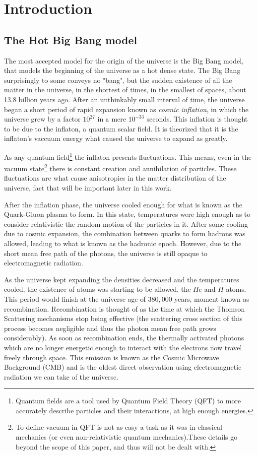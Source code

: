 \chapter{Introduction}

\section{The Hot Big Bang model}

The most accepted model for the origin of the universe is the Big Bang model, that models the beginning of the universe as a hot dense state. The Big Bang surprisingly to some conveys no "bang", but the sudden existence of all the matter in the universe, in the shortest of times, in the smallest of spaces, about 13.8 billion years ago. After an unthinkably small interval of time, the universe began a short period of rapid expansion known as \textit{cosmic inflation}, in which the universe grew by a factor $10^{27}$ in a mere $10^{-33}$ seconds. This inflation is thought to be due to the inflaton, a quantum scalar field. It is theorized that it is the inflaton's vaccuum energy what caused the universe to expand as greatly.

As any quantum field\footnote{Quantum fields are a tool used by Quantum Field Theory (QFT) to more accurately describe particles and their interactions, at high enough energies.} the inflaton presents fluctuations. This means, even in the vacuum state\footnote{To define vacuum in QFT is not as easy a task as it was in classical mechanics (or even non-relativistic quantum mechanics).These details go beyond the scope of this paper, and thus will not be dealt with.} there is constant creation and annihilation of particles. These fluctuations are what cause anisotropies in the matter distribution of the universe, fact that will be important later in this work.

After the inflation phase, the universe cooled enough for what is known as the Quark-Gluon plasma to form. In this state, temperatures were high enough as to consider relativistic the random motion of the particles in it. After some cooling due to cosmic expansion, the combination between quarks to form hadrons was allowed, leading to what is known as the hadronic epoch. However, due to the short mean free path of the photons, the universe is still opaque to electromagnetic radiation.

As the universe kept expanding the densities decreased and the temperatures cooled, the existence of atoms was starting to be allowed, the $He$ and $H$ atoms. This period would finish at the universe age of $380,000$ years, moment known as recombination. Recombination is thought of as the time at which the Thomson Scattering mechanisms stop being effective (the scattering cross section of this process becomes negligible and thus the photon mean free path grows considerably).
As soon as recombination ends, the thermally activated photons which are no longer energetic enough to interact with the electrons now travel freely through space. This emission is known as the Cosmic Microwave Background (CMB) and is the oldest direct observation using electromagnetic radiation we can take of the universe.


